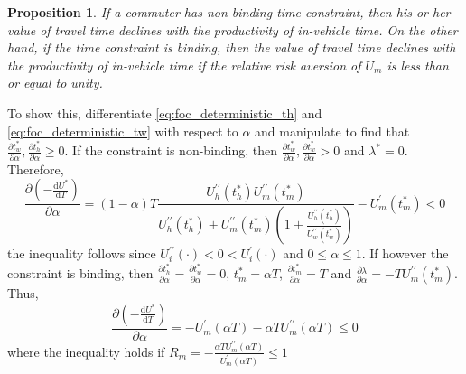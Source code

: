 \documentclass[12pt,a4paper,british]{article}
\makeatletter
\newenvironment{proof}[1][\proofname]{\par
    \normalfont\topsep6\p@\@plus6\p@\relax
    \trivlist
    \itemindent\parindent
    \item[\hskip\labelsep
          \scshape
      #1]\ignorespaces
  }{%
    \endtrivlist\@endpefalse
  }
\providecommand{\proofname}{Proof}
\newtheorem{prop}{Proposition}[section]
\makeatother
\begin{document}
\begin{prop}
If a commuter has non-binding time constraint, then his or her value of travel time declines with the productivity of in-vehicle time. On the other hand, if the time constraint is binding, then the value of travel time declines with the productivity of in-vehicle time if the relative risk aversion of $U_m$ is less than or equal to unity.
\end{prop}


\begin{proof}
To show this, differentiate \eqref{eq:foc_deterministic_th} and \eqref{eq:foc_deterministic_tw} with respect to $\alpha$ and manipulate to find that $\frac{\partial t_{w}^{\ast}}{\partial\alpha} , \frac{\partial t_{h}^{\ast}}{\partial\alpha} \geq 0$. If the constraint is non-binding, then $\frac{\partial t_{w}^{\ast}}{\partial\alpha}, \frac{\partial t_{w}^{\ast}}{\partial\alpha} > 0$ and $\lambda^{\ast} = 0$. Therefore,%
\begin{equation*}
\frac{\partial\left( - \frac{\mathrm{d}U^{\ast}}{\mathrm{d}T}\right)}{\partial\alpha} = \left(1 - \alpha\right) T\frac{U_{h}^{\prime\prime}\left(t_{h}^{\ast}\right) U_{m}^{\prime\prime}\left(t_{m}^{\ast}\right)}{U_{h}^{\prime\prime}\left(t_{h}^{\ast}\right) + U_{m}^{\prime\prime}\left(t_{m}^{\ast}\right)\left(1+\frac{U_{h}^{\prime\prime}\left(t_{h}^{\ast}\right)}{U_{w}^{\prime\prime}\left(t_{w}^{\ast}\right)}\right)}-U_{m}^{\prime}\left(t_{m}^{\ast}\right) < 0
\end{equation*}
the inequality follows since $U_i^{\prime\prime}\left( \cdot \right) <  0 < U_i^{\prime}\left( \cdot \right)$ and $0\leq \alpha \leq 1$. If however the constraint is binding, then $\frac{\partial t_{h}^{\ast}}{\partial\alpha}=\frac{\partial t_{w}^{\ast}}{\partial\alpha} = 0$, $t_m^{\ast} = \alpha T$, $\frac{\partial t_{m}^{\ast}}{\partial\alpha}=T$ and $\frac{\partial\lambda}{\partial\alpha}=-TU_{m}^{\prime\prime}\left(t_{m}^{\ast}\right)$. Thus,%
\begin{equation*}
\frac{\partial\left(-\frac{\mathrm{d}U^{\ast}}{\mathrm{d}T}\right)}{\partial\alpha}= - U_{m}^{\prime}\left(\alpha T \right) - \alpha T U_{m}^{\prime\prime}\left(\alpha T \right) \leq 0
\end{equation*}
where the inequality holds if $R_m = -\frac{\alpha T U_{m}^{\prime\prime}\left(\alpha T \right)}{U_{m}^{\prime}\left(\alpha T \right)} \leq 1$

\end{proof}
\end{document}
